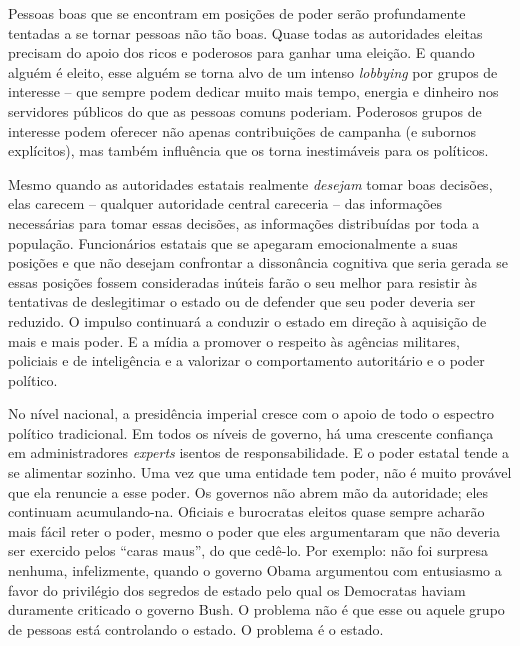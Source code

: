 Pessoas boas que se encontram em posições de poder serão profundamente tentadas a se tornar pessoas não tão boas. Quase todas as autoridades eleitas precisam do apoio dos ricos e poderosos para ganhar uma eleição. E quando alguém é eleito, esse alguém se torna alvo de um intenso \emph{lobbying} por grupos de interesse -- que sempre podem dedicar muito mais tempo, energia e dinheiro nos servidores públicos do que as pessoas comuns poderiam. Poderosos grupos de interesse podem oferecer não apenas contribuições de campanha (e subornos explícitos), mas também influência que os torna inestimáveis para os políticos.

Mesmo quando as autoridades estatais realmente \emph{desejam} tomar boas decisões, elas carecem -- qualquer autoridade central careceria -- das informações necessárias para tomar essas decisões, as informações distribuídas por toda a população. Funcionários estatais que se apegaram emocionalmente a suas posições e que não desejam confrontar a dissonância cognitiva que seria gerada se essas posições fossem consideradas inúteis farão o seu melhor para resistir às tentativas de deslegitimar o estado ou de defender que seu poder deveria ser reduzido. O impulso continuará a conduzir o estado em direção à aquisição de mais e mais poder. E a mídia a promover o respeito às agências militares, policiais e de inteligência e a valorizar o comportamento autoritário e o poder político.

No nível nacional, a presidência imperial cresce com o apoio de todo o espectro político tradicional. Em todos os níveis de governo, há uma crescente confiança em administradores \emph{experts} isentos de responsabilidade. E o poder estatal tende a se alimentar sozinho. Uma vez que uma entidade tem poder, não é muito provável que ela renuncie a esse poder. Os governos não abrem mão da autoridade; eles continuam acumulando-na. Oficiais e burocratas eleitos quase sempre acharão mais fácil reter o poder, mesmo o poder que eles argumentaram que não deveria ser exercido pelos ``caras maus'', do que cedê-lo. Por exemplo: não foi surpresa nenhuma, infelizmente, quando o governo Obama argumentou com entusiasmo a favor do privilégio dos segredos de estado pelo qual os Democratas haviam duramente criticado o governo Bush. O problema não é que esse ou aquele grupo de pessoas está controlando o estado. O problema é o estado.

